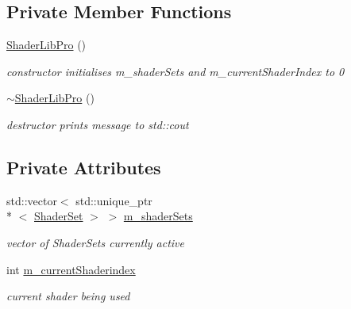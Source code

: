 \subsection*{Private Member Functions}
\begin{DoxyCompactItemize}
\item 
\hypertarget{class_shader_lib_pro_a69c266b5eabde43b4ca472f36489a1ef}{\hyperlink{class_shader_lib_pro_a69c266b5eabde43b4ca472f36489a1ef}{Shader\-Lib\-Pro} ()}\label{class_shader_lib_pro_a69c266b5eabde43b4ca472f36489a1ef}

\begin{DoxyCompactList}\small\item\em constructor initialises m\-\_\-shader\-Sets and m\-\_\-current\-Shader\-Index to 0 \end{DoxyCompactList}\item 
\hypertarget{class_shader_lib_pro_a78b250ffc06b58d1a6de95ccadead58d}{\hyperlink{class_shader_lib_pro_a78b250ffc06b58d1a6de95ccadead58d}{$\sim$\-Shader\-Lib\-Pro} ()}\label{class_shader_lib_pro_a78b250ffc06b58d1a6de95ccadead58d}

\begin{DoxyCompactList}\small\item\em destructor prints message to std\-::cout \end{DoxyCompactList}\end{DoxyCompactItemize}
\subsection*{Private Attributes}
\begin{DoxyCompactItemize}
\item 
\hypertarget{class_shader_lib_pro_ab5415f8247ca7df067ad212ed624cd29}{std\-::vector$<$ std\-::unique\-\_\-ptr\\*
$<$ \hyperlink{class_shader_set}{Shader\-Set} $>$ $>$ \hyperlink{class_shader_lib_pro_ab5415f8247ca7df067ad212ed624cd29}{m\-\_\-shader\-Sets}}\label{class_shader_lib_pro_ab5415f8247ca7df067ad212ed624cd29}

\begin{DoxyCompactList}\small\item\em vector of Shader\-Sets currently active \end{DoxyCompactList}\item 
\hypertarget{class_shader_lib_pro_a14c11ed244083ea9e82f8e040ba684b9}{int \hyperlink{class_shader_lib_pro_a14c11ed244083ea9e82f8e040ba684b9}{m\-\_\-current\-Shaderindex}}\label{class_shader_lib_pro_a14c11ed244083ea9e82f8e040ba684b9}

\begin{DoxyCompactList}\small\item\em current shader being used \end{DoxyCompactList}\end{DoxyCompactItemize}
